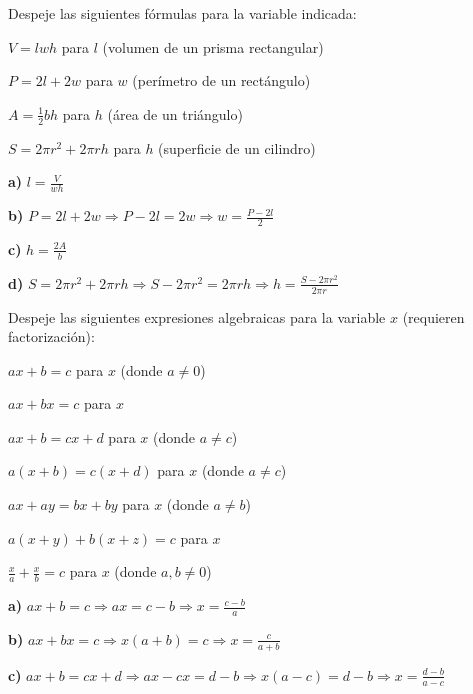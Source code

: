\begin{exercise}
\problem Despeje las siguientes fórmulas para la variable indicada:

\begin{exerciselist}
    \item $V = lwh$ para $l$ (volumen de un prisma rectangular)
    \item $P = 2l + 2w$ para $w$ (perímetro de un rectángulo)
    \item $A = \frac{1}{2}bh$ para $h$ (área de un triángulo)
    \item $S = 2\pi r^2 + 2\pi rh$ para $h$ (superficie de un cilindro)
\end{exerciselist}

\begin{solucion}
\textbf{a)} $l = \frac{V}{wh}$

\textbf{b)} $P = 2l + 2w \Rightarrow P - 2l = 2w \Rightarrow w = \frac{P - 2l}{2}$

\textbf{c)} $h = \frac{2A}{b}$

\textbf{d)} $S = 2\pi r^2 + 2\pi rh \Rightarrow S - 2\pi r^2 = 2\pi rh \Rightarrow h = \frac{S - 2\pi r^2}{2\pi r}$
\end{solucion}

\problem Despeje las siguientes expresiones algebraicas para la variable $x$ (requieren factorización):

\begin{exerciselist}
    \item $ax + b = c$ para $x$ (donde $a \neq 0$)
    \item $ax + bx = c$ para $x$
    \item $ax + b = cx + d$ para $x$ (donde $a \neq c$)
    \item $a(x + b) = c(x + d)$ para $x$ (donde $a \neq c$)
    \item $ax + ay = bx + by$ para $x$ (donde $a \neq b$)
    \item $a(x + y) + b(x + z) = c$ para $x$
    \item $\frac{x}{a} + \frac{x}{b} = c$ para $x$ (donde $a, b \neq 0$)
\end{exerciselist}

\begin{solucion}
\textbf{a)} $ax + b = c \Rightarrow ax = c - b \Rightarrow x = \frac{c - b}{a}$

\textbf{b)} $ax + bx = c \Rightarrow x(a + b) = c \Rightarrow x = \frac{c}{a + b}$

\textbf{c)} $ax + b = cx + d \Rightarrow ax - cx = d - b \Rightarrow x(a - c) = d - b \Rightarrow x = \frac{d - b}{a - c}$


\end{solucion}
\end{exercise}
